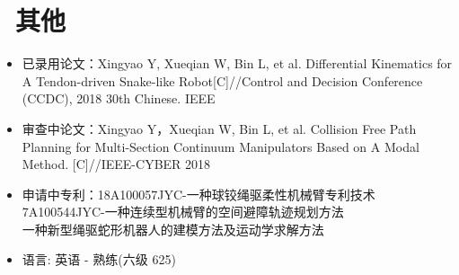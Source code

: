 \documentclass{resume}
\begin{document}
\section{\faInfo\ 其他}
\begin{itemize}[parsep=0.5ex]
  \item 已录用论文：Xingyao Y, Xueqian W, Bin L, et al. Differential Kinematics for A Tendon-driven Snake-like Robot[C]//Control and Decision Conference (CCDC), 2018 30th Chinese. IEEE
  \item 审查中论文：Xingyao Y，Xueqian W, Bin L, et al. Collision Free Path Planning for Multi-Section Continuum Manipulators Based on A Modal Method. [C]//IEEE-CYBER 2018
  \item 申请中专利：18A100057JYC-一种球铰绳驱柔性机械臂专利技术\\
  \hspace*{6em}7A100544JYC-一种连续型机械臂的空间避障轨迹规划方法\\
  \hspace*{6em}一种新型绳驱蛇形机器人的建模方法及运动学求解方法
  \item 语言: 英语 - 熟练(六级 625)
  			
\end{itemize}

%
%
\end{document}
